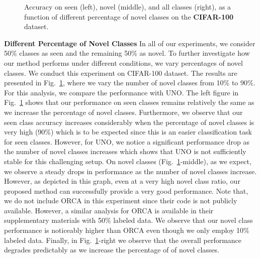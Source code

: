 \documentclass[runningheads]{eccv2022submission}
\begin{document}
\begin{figure}
\captionsetup[subfloat]{labelformat=empty}
\vspace{-6mm}
    \centering
\vspace{-6mm}
    \caption{Accuracy on seen (left), novel (middle), and all classes (right), as a function of  different percentage of novel classes on the \textbf{CIFAR-100} dataset.}
    \label{fig:differentnovelprct}
    \vspace{-4mm}
\end{figure}

\noindent \textbf{Different Percentage of Novel Classes} 
In all of our experiments, we consider 50\% classes as seen and the remaining 50\% as novel. To further investigate how our method performs under different conditions, we vary percentages of novel classes. We conduct this experiment on CIFAR-100 dataset. The results are presented in Fig.~\ref{fig:differentnovelprct}, where we vary the number of novel classes from 10\% to 90\%. For this analysis, we compare the performance with UNO. The left figure in Fig.~\ref{fig:differentnovelprct} shows that our performance on seen classes remains relatively the same as we increase the percentage of novel classes. Furthermore, we observe that our seen class accuracy increases considerably when the percentage of novel classes is very high (90\%) which is to be expected since this is an easier classification task for seen classes. However, for UNO, we notice a significant performance drop as the number of novel classes increases which shows that UNO is not sufficiently stable for this challenging setup. On novel classes (Fig.~\ref{fig:differentnovelprct}-middle), as we expect, we observe a steady drops in performance as the number of novel classes increase. However, as depicted in this graph, even at a very high novel class ratio, our proposed method can successfully provide a very good performance. Note that, we do not include ORCA in this experiment since their code is not publicly available. However, a similar analysis for ORCA is available in their supplementary materials with 50\% labeled data. We observe that our novel class performance is noticeably higher than ORCA even though we only employ 10\% labeled data. Finally, in Fig.~\ref{fig:differentnovelprct}-right we observe that the overall performance degrades predictably as we increase the percentage of of novel classes.
\end{document}
